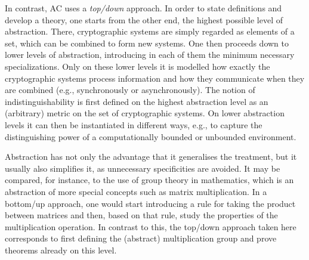 In contrast, AC uses a \emph{top\-/down} approach. In order to state definitions and develop a theory, one starts from the other end, the highest possible level of abstraction. There, cryptographic systems are simply regarded as elements of a set, which can be combined to form new systems. One then proceeds down to lower levels of abstraction, introducing in each of them the minimum necessary specializations. Only on these lower levels it is modelled how exactly the cryptographic systems process information and how they communicate when they are combined (e.g., synchronously or asynchronously). The notion of indistinguishability is first defined on the highest abstraction level as an (arbitrary) metric on the set of cryptographic systems. On lower abstraction levels it can then be instantiated in different ways, e.g., to capture the distinguishing power of a computationally bounded or unbounded environment. 

Abstraction has not only the advantage that it generalises the treatment, but it usually also simplifies it, as unnecessary specificities are avoided.  It may be compared, for instance, to the use of group theory in mathematics, which is an abstraction of more special concepts such as matrix multiplication.  In a bottom\-/up approach, one would
start introducing a rule for taking the product between matrices and then, based on that rule, study the properties of the multiplication operation. In contrast to this, the
top\-/down approach taken here corresponds to first defining the (abstract) multiplication group and prove theorems already on this level. 





